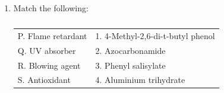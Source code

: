 \documentclass[a4paper,10pt]{article}
\begin{document}
\begin{enumerate}
    \item Match the following:
    \begin{table}[h!] \centering \caption*{} \label{tab:q14_poly_2018}
        \begin{tabular}{|l|l|} \hline
        P. Flame retardant & 1. 4-Methyl-2,6-di-t-butyl phenol \\
        Q. UV absorber & 2. Azocarbonamide \\
        R. Blowing agent & 3. Phenyl salisylate \\
        S. Antioxidant & 4. Aluminium trihydrate \\ \hline
        \end{tabular}
    \end{table}
    \hfill{}
    \begin{enumerate}[label=\Alph*)]
    \end{enumerate}


\end{enumerate}
\end{document}
